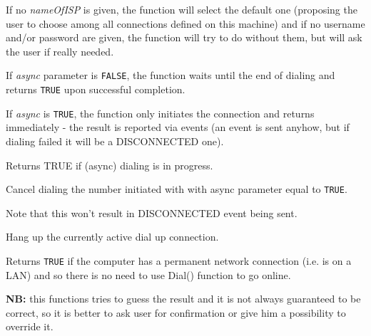 If no {\it nameOfISP} is given, the function will select the default one
(proposing the user to choose among all connections defined on this machine)
and if no username and/or password are given, the function will try to do
without them, but will ask the user if really needed.

If {\it async} parameter is {\tt FALSE}, the function waits until the end of dialing
and returns {\tt TRUE} upon successful completion.

If {\it async} is {\tt TRUE}, the function only initiates the connection and
returns immediately - the result is reported via events (an event is sent
anyhow, but if dialing failed it will be a DISCONNECTED one).

\label{wxdialupmanagerisdialing}


Returns TRUE if (async) dialing is in progress.



\label{wxdialupmanagercanceldialing}


Cancel dialing the number initiated with  
with async parameter equal to {\tt TRUE}.

Note that this won't result in DISCONNECTED event being sent.



\label{wxdialupmanagerhangup}


Hang up the currently active dial up connection.

\label{wxdialupmanagerisalwaysonline}


Returns {\tt TRUE} if the computer has a permanent network connection (i.e. is
on a LAN) and so there is no need to use Dial() function to go online.

{\bf NB:} this functions tries to guess the result and it is not always
guaranteed to be correct, so it is better to ask user for
confirmation or give him a possibility to override it.


